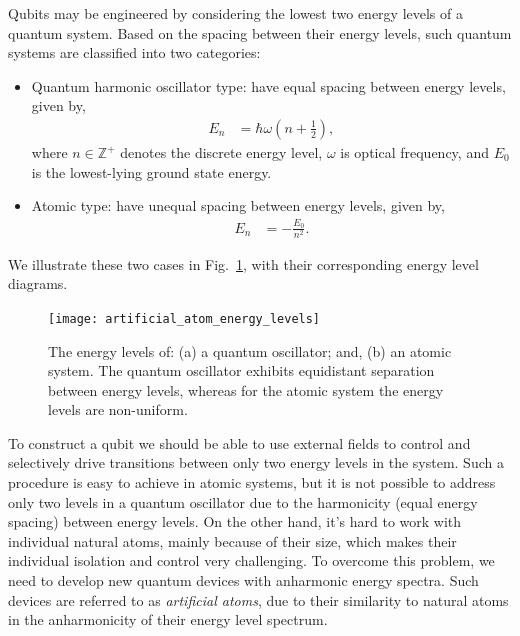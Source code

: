 Qubits may be engineered by considering the lowest two energy levels of a quantum system. Based on the spacing between their energy levels, such quantum systems are classified into two categories:
\begin{itemize}
	\item Quantum harmonic oscillator type: have equal spacing between energy levels, given by,
	\begin{align}
	E_{n} &= \hbar \omega \left(n+\frac{1}{2}\right),
	\end{align}
	where \mbox{$n\in\mathbb{Z}^+$} denotes the discrete energy level, $\omega$ is optical frequency, and $E_0$ is the lowest-lying ground state energy.
	\item Atomic type: have unequal spacing between energy levels, given by,
	\begin{align}
	E_{n} &= -\frac{E_{0}}{n^{2}}.
	\end{align}
\end{itemize}
We illustrate these two cases in Fig.~\ref{fig:artificial_atom_energy_levels}, with their corresponding energy level diagrams.

\begin{figure}[!htbp]
\texttt{[image: artificial\_atom\_energy\_levels]}
\captionspacefig \caption{The energy levels of: (a) a quantum oscillator; and, (b) an atomic system. The quantum oscillator exhibits equidistant separation between energy levels, whereas for the atomic system the energy levels are non-uniform.}\label{fig:artificial_atom_energy_levels}
\end{figure}

To construct a qubit we should be able to use external fields to control and selectively drive transitions between only two energy levels in the system. Such a procedure is easy to achieve in atomic systems, but it is not possible to address only two levels in a quantum oscillator due to the harmonicity (equal energy spacing) between energy levels. On the other hand, it's hard to work with individual natural atoms, mainly because of their size, which makes their individual isolation and control very challenging. To overcome this problem, we need to develop new quantum devices with anharmonic energy spectra. Such devices are referred to as \textit{artificial atoms}, due to their similarity to natural atoms in the anharmonicity of their energy level spectrum.


